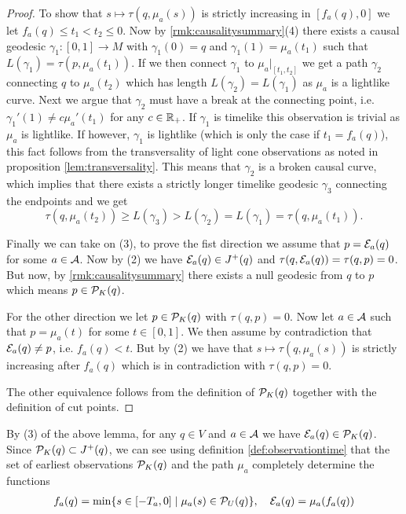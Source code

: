 \begin{proof}
To show that $s\mapsto \tau(q,\mu_a(s))$ is strictly increasing in $[f_a(q),0]$ we let $f_a(q)\leq t_1<t_2\leq 0$. Now by \ref{rmk:causalitysummary}(4) there exists a causal geodesic $\gamma_1:[0,1]\to M$ with $\gamma_1(0)=q$ and $\gamma_1(1)=\mu_a(t_1)$ such that $L(\gamma_1)=\tau(p,\mu_a(t_1))$. 
If we then connect $\gamma_1$ to $\mu_a\rvert_{[t_1,t_2]}$ we get a path $\gamma_2$ connecting $q$ to $\mu_a(t_2)$ which has length $L(\gamma_2) = L(\gamma_1)$ as $\mu_a$ is a lightlike curve. Next we argue that $\gamma_2$ must have a break at the connecting point, i.e. $\gamma_1'(1) \neq c\mu_a'(t_1)$ for any $c\in \R_+$. If $\gamma_1$ is timelike this observation is trivial as $\mu_a$ is lightlike. If however, $\gamma_1$ is lightlike (which is only the case if $t_1=f_a(q)$), this fact follows from the transversality of light cone observations as noted in proposition \ref{lem:transversality}. This means that $\gamma_2$ is a broken causal curve, which implies that there exists a strictly longer timelike geodesic $\gamma_3$ connecting the endpoints and we get
\[
\tau(q,\mu_a(t_2)) \geq L(\gamma_3) > L(\gamma_2) = L(\gamma_1) = \tau(q,\mu_a(t_1)).
\]

Finally we can take on (3),
to prove the fist direction we assume that $p=\mc{E}_a(q)$ for some $a\in \mc{A}$. Now by (2) we have $\mc{E}_a(q) \in J^+(q)$ and $\tau(q,\mc{E}_a(q))=\tau(q,p)=0$. But now, by \ref{rmk:causalitysummary} there exists a null geodesic from $q$ to $p$ which means $p\in \mc{P}_K(q)$. 

For the other direction we let $p\in \mc{P}_K(q)$ with $\tau(q,p)=0$. Now let $a\in \mc{A}$ such that $p=\mu_a(t)$ for some $t\in [0,1]$. We then assume by contradiction that $\mc{E}_a(q) \neq p$, i.e. $f_a(q) < t$. But by (2) we have that $s\mapsto\tau(q,\mu_a(s))$ is strictly increasing after $f_a(q)$ which is in contradiction with $\tau(q,p)=0$.

The other equivalence follows from the definition of $\mc{P}_K(q)$ together with the definition of cut points.
\end{proof}

By (3) of the above lemma, for any $q\in V$ and $a\in \ca$ we have $\mc{E}_a(q)\in \P_K(q)$. Since $\P_K(q)\subset J^+(q)$, we can see using definition \ref{def:observationtime} that the set of earliest observations $\P_K(q)$ and the path $\mu_a$ completely determine the functions
\begin{align}\label{eq:observationtimerestated}
    f_a(q) = \min \{ s\in [-T_a,0] \mid \mu_a(s)\in \P_U(q) \}, \quad \mc{E}_a(q) = \mu_a(f_a(q))
\end{align}

